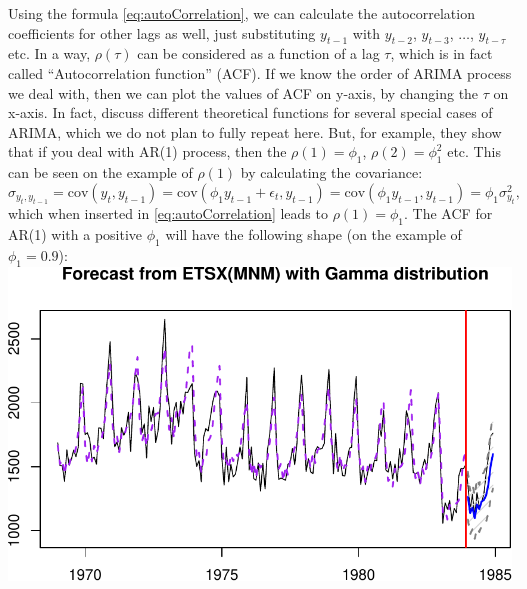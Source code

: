 \documentclass[
]{book}
\theoremstyle{definition}
\theoremstyle{definition}
\theoremstyle{definition}
\theoremstyle{definition}
\theoremstyle{remark}
\begin{document}
Using the formula \eqref{eq:autoCorrelation}, we can calculate the autocorrelation coefficients for other lags as well, just substituting \(y_{t-1}\) with \(y_{t-2}\), \(y_{t-3}\), \(\dots\), \(y_{t-\tau}\) etc. In a way, \(\rho(\tau)\) can be considered as a function of a lag \(\tau\), which is in fact called ``Autocorrelation function'' (ACF). If we know the order of ARIMA process we deal with, then we can plot the values of ACF on y-axis, by changing the \(\tau\) on x-axis. In fact, \citet{Box1976} discuss different theoretical functions for several special cases of ARIMA, which we do not plan to fully repeat here. But, for example, they show that if you deal with AR(1) process, then the \(\rho(1)=\phi_1\), \(\rho(2)=\phi_1^2\) etc. This can be seen on the example of \(\rho(1)\) by calculating the covariance:
\begin{equation}
  \sigma_{y_t,y_{t-1}} = \mathrm{cov}(y_t,y_{t-1}) = \mathrm{cov}(\phi_1 y_{t-1} + \epsilon_t, y_{t-1}) = \mathrm{cov}(\phi_1 y_{t-1}, y_{t-1}) = \phi_1 \sigma_{y_t}^2 ,
  \label{eq:autoCovarianceAR1}
\end{equation}
which when inserted in \eqref{eq:autoCorrelation} leads to \(\rho(1)=\phi_1\). The ACF for AR(1) with a positive \(\phi_1\) will have the following shape (on the example of \(\phi_1=0.9\)):
\includegraphics{adam_files/figure-latex/unnamed-chunk-58-1.pdf}
\end{document}
